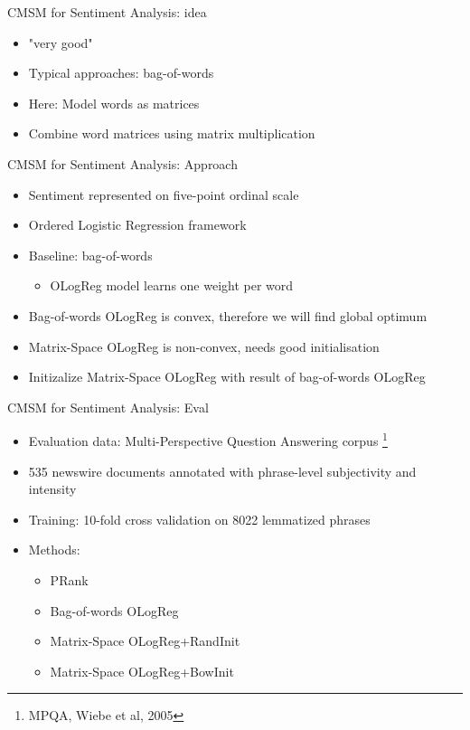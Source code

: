 \documentclass[12pt,a4paper]{beamer}
\begin{document}
\begin{frame}{CMSM for Sentiment Analysis: idea}
\begin{itemize}
\item "very good"
\item Typical approaches: bag-of-words
\item Here: Model  words as matrices
\item Combine word matrices using matrix multiplication
\end{itemize}
\end{frame}

\begin{frame}{CMSM for Sentiment Analysis: Approach}
\begin{itemize}
\item Sentiment represented on five-point ordinal scale
\item Ordered Logistic Regression framework
\item Baseline: bag-of-words
\begin{itemize}
    \item OLogReg model learns one weight per word
\end{itemize}
\item Bag-of-words OLogReg is convex, therefore we will find global optimum
\item Matrix-Space OLogReg is non-convex, needs good initialisation
\item Initizalize Matrix-Space OLogReg with result of bag-of-words OLogReg
 
\end{itemize}
\end{frame}


\begin{frame}{CMSM for Sentiment Analysis: Eval}
\begin{itemize}
\item Evaluation data: Multi-Perspective Question Answering corpus \footnote{MPQA, Wiebe et al, 2005}
\item 535 newswire documents annotated with phrase-level subjectivity and intensity
\item Training: 10-fold cross validation on 8022 lemmatized phrases
\item Methods:
\begin{itemize}
    \item PRank
    \item Bag-of-words OLogReg
    \item Matrix-Space OLogReg+RandInit
    \item Matrix-Space OLogReg+BowInit
\end{itemize}
\end{itemize}
\end{frame}
\end{document}
